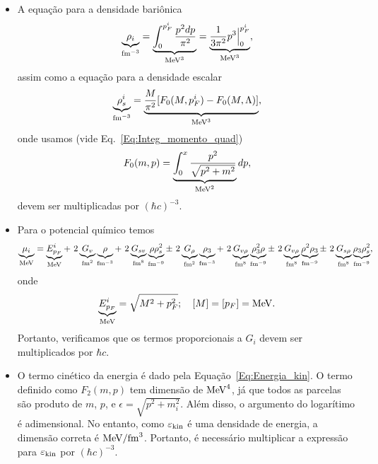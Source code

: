 \begin{enumerate}
\begin{fullwidth}
\begin{itemize}
\item A equação para a densidade bariônica
\begin{equation}
	\underbrace{\rho_i}_{\rm{fm}^{-3}} = \underbrace{\int_0^{p_F^i} \frac{p^2 dp}{\pi^2}}_{\rm{MeV}^3} = \underbrace{\frac{1}{3\pi^2}p^3\Big|_0^{p_F^i}}_{\rm{MeV}^3},
\end{equation}
%
assim como a equação para a densidade escalar
\begin{equation}
	\underbrace{\rho_s^i}_{\rm{fm}^{-3}} = \underbrace{\frac{M}{\pi^2}[F_0(M,p_F^i) - F_0(M, \Lambda)]}_{\rm{MeV}^3},
\end{equation}
%
onde usamos (vide Eq.~\eqref{Eq:Integ_momento_quad})
\begin{equation}
	F_0(m,p) = \underbrace{\int_0^x \frac{p^2}{\sqrt{p^2 + m^2}}}_{\rm{MeV}^2} dp,
\end{equation}
%
devem ser multiplicadas por $(\hbar c)^{-3}$.

\item Para o potencial químico temos
\begin{equation}
	\underbrace{\mu_i}_{\rm{MeV}} = \underbrace{E_{p_F}^i}_{\rm{MeV}} +~2 \underbrace{G_v}_{\rm{fm}^2}\underbrace{\rho}_{\rm{fm^{-3}}} +~2 \underbrace{G_{sv}}_{\rm{fm}^8}\underbrace{\rho\rho_s^2}_{\rm{fm^{-9}}} \pm~2 \underbrace{G_\rho}_{\rm{fm}^2}\underbrace{\rho_3}_{\rm{fm^{-3}}} +~2 \underbrace{G_{v\rho}}_{\rm{fm}^8}\underbrace{\rho_3^2\rho}_{\rm{fm^{-9}}} \pm~2 \underbrace{G_{v\rho}}_{\rm{fm}^8}\underbrace{\rho^2\rho_3}_{\rm{fm^{-9}}} \pm~2
\underbrace{G_{s\rho}}_{\rm{fm}^8}\underbrace{\rho_3\rho_s^2}_{\rm{fm^{-9}}},
\end{equation}
%
onde
\begin{equation}
	\underbrace{E_{p_F}^i}_{\rm{MeV}} = \sqrt{M^2 + p_F^2}; \quad [M] = [p_F] = \rm{MeV}.
\end{equation}
%
Portanto, verificamos que os termos proporcionais a $G_i$ devem ser multiplicados por $\hbar c$.

\item O termo cinético da energia é dado pela Equação~\eqref{Eq:Energia_kin}. O termo definido como $F_2(m, p)$ tem dimensão de $\rm{MeV}^4$, já que todos as parcelas são produto de $m$, $p$, e $\epsilon = \sqrt{p^2+m_i^2}$. Além disso, o argumento do logarítimo é adimensional. No entanto, como $\varepsilon_{\rm{kin}}$ é uma densidade de energia, a dimensão correta é $\rm{MeV} / \rm{fm}^3$. Portanto, é necessário multiplicar a expressão para $\varepsilon_{\rm{kin}}$ por $(\hbar c)^{-3}$.
\end{itemize}
\end{fullwidth}


\end{enumerate}
